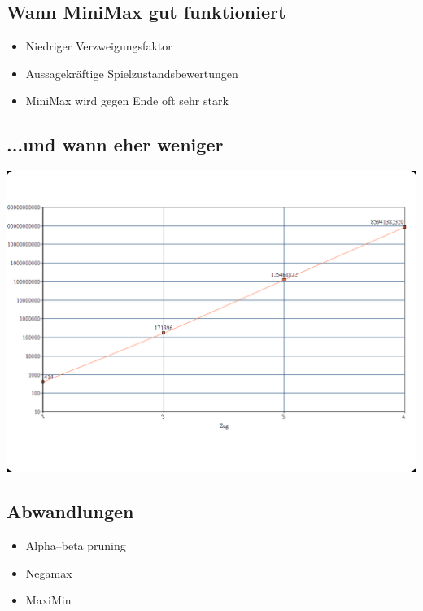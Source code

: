 \documentclass[12pt, draft]{beamer}
\begin{document}
\subsection{Wann MiniMax gut funktioniert}
\begin{frame}
    \begin{itemize}
      \item<1-| alert@4> Niedriger Verzweigungsfaktor
      \item<2-> Aussagekräftige Spielzustandsbewertungen
      \item<3-> MiniMax wird gegen Ende oft sehr stark
    \end{itemize}
\end{frame}

\subsection{...und wann eher weniger}
\begin{frame}
	\includegraphics[width=\linewidth]{media/mmexp1.png}
\end{frame}

\subsection{Abwandlungen}
\begin{frame}
    \begin{itemize}
		\item<1-> Alpha–beta pruning
		\item<2-> Negamax
		\item<2-> MaxiMin
    \end{itemize}
\end{frame}
\end{document}
